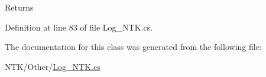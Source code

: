 \begin{DoxyReturn}{Returns}

\end{DoxyReturn}


Definition at line 83 of file Log\+\_\+\+N\+T\+K.\+cs.



The documentation for this class was generated from the following file\+:\begin{DoxyCompactItemize}
\item 
N\+T\+K/\+Other/\mbox{\hyperlink{_log___n_t_k_8cs}{Log\+\_\+\+N\+T\+K.\+cs}}\end{DoxyCompactItemize}
